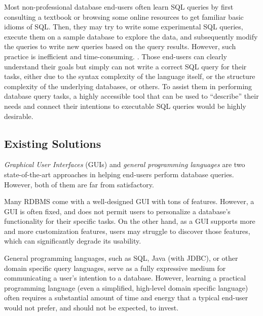 Most non-professional database end-users often learn
SQL queries by first  consulting a textbook or browsing some
online resources to get familiar basic idioms of SQL.
Then, they may try to write some experimental SQL queries, execute them
on a sample database to explore the data, and subsequently  modify
the queries to write new queries based on the query results.
However, such practice is inefficient and time-consuming.
.
Those end-users can clearly understand
their goals but simply can not write a correct SQL query for
their tasks, either due to the syntax complexity of the language itself,
or the structure complexity of the underlying databases, or others.
To assist them in performing database query tasks,
a highly accessible tool that can be used to ``describe''
their needs and connect their intentions to executable
SQL queries would be highly desirable.


\subsection{Existing Solutions}


\textit{Graphical User Interfaces} (GUIs) and \textit{general programming languages}
are two state-of-the-art approaches in helping end-users perform
database queries. However, both of them are far from satisfactory.

Many RDBMS come with a well-designed GUI with tons of features.
However, 
a GUI is often fixed, and does not permit users to personalize
a database's functionality for their specific tasks. On the other hand,
as a GUI supports more and more customization features, users
may struggle to discover those features, which can significantly
degrade its usability. 

General programming languages, such as SQL,
Java (with JDBC), or other domain specific query languages, 
serve as a fully expressive medium  for
communicating a user's intention to a database. However, learning
a practical programming language (even a simplified, high-level domain
specific language) often requires a substantial amount
of time and energy that a typical end-user would not prefer,
and should not be expected, to invest. 



